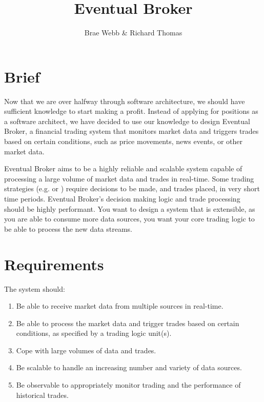 \documentclass{csse4400}
\title{Eventual Broker}
\author{Brae Webb \& Richard Thomas}
\date{\week[tutorial]{7}}
\begin{document}
\maketitle

\section{Brief}

Now that we are over halfway through software architecture,
we should have sufficient knowledge to start making a profit.
Instead of applying for positions as a software architect,
we have decided to use our knowledge to design 
Eventual Broker,
a financial trading system that monitors market data and triggers trades based on certain conditions,
such as price movements, news events, or other market data.

Eventual Broker aims to be a highly reliable and scalable system capable of processing a large volume of market data and trades in real-time.
Some trading strategies (e.g. 
or )
require decisions to be made, and trades placed, in very short time periods.
Eventual Broker's decision making logic and trade processing should be highly performant.
You want to design a system that is extensible,
as you are able to consume more data sources,
you want your core trading logic to be able to process the new data streams.

\section{Requirements}

The system should:
\begin{enumerate}
\item Be able to receive market data from multiple sources in real-time.
\item Be able to process the market data and trigger trades based on certain conditions, as specified by a trading logic unit(s).
\item Cope with large volumes of data and trades.
\item Be scalable to handle an increasing number and variety of data sources.
\item Be observable to appropriately monitor trading and the performance of historical trades.
\end{enumerate}
\end{document}
